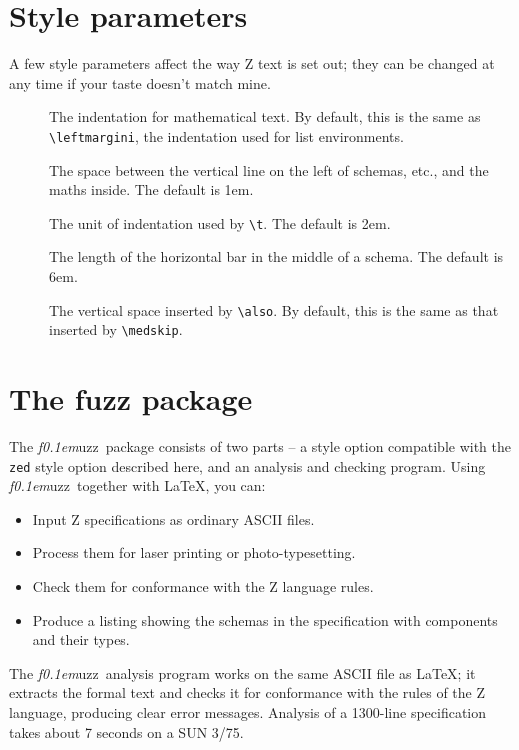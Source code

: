 \documentclass{article}
\def\fuzz{{\large\it f\kern0.1em}{\normalsize\sc uzz}}
\begin{document}
\section{Style parameters}

A few style parameters affect the way Z text is set out; they can be
changed at any time if your taste doesn't match mine.

\begin{description}
\item[\tt\string\zedindent] The indentation for mathematical text.
        By default, this is the same as %
\verb|\leftmargini|, the indentation
        used for list environments.
\item[\tt\string\zedleftsep] The space between the vertical line on the left
        of schemas, etc., and the maths inside. The default is 1em.
\item[\tt\string\zedtab] The unit of indentation used by %
\verb|\t|. The default
        is 2em.
\item[\tt\string\zedbar] The length of the horizontal bar in the middle of a
        schema. The default is 6em.
\item[\tt\string\zedskip] The vertical space inserted by
\verb/\also/. By default, this is the same as that inserted by
\verb/\medskip/.
\end{description}

\newpage
\section{The fuzz package}

The \fuzz\ package consists of two parts -- a style option compatible
with the {\tt zed} style option described here, and an analysis and
checking program.  Using \fuzz\ together with \LaTeX, you can:
\begin{itemize}
\item   Input Z specifications as ordinary ASCII files.
\item   Process them for laser printing or photo-typesetting.
\item   Check them for conformance with the Z language rules.
\item   Produce a listing showing the schemas in the specification with
        components and their types.
\end{itemize}
The \fuzz\ analysis program works on the same ASCII file as \LaTeX; it
extracts the formal text and checks it for conformance with the rules
of the Z language, producing clear error messages.  Analysis of a
1300-line specification takes about 7 seconds on a SUN 3/75.
\end{document}

